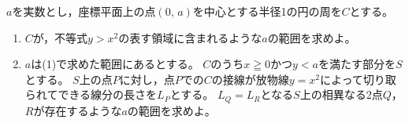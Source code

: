 \documentclass[../../main.tex]{subfiles}
\begin{document}
$a$を実数とし，座標平面上の点$(0, \, a)$を中心とする半径1の円の周を$C$とする。
\begin{enumerate}
  \item$C$が，不等式$y>x^2$の表す領域に含まれるような$a$の範囲を求めよ。
  \item$a$は(1)で求めた範囲にあるとする。
    $C$のうち$x\geqq0$かつ$y<a$を満たす部分を$S$とする。
    $S$上の点$P$に対し，点$P$での$C$の接線が放物線$y=x^2$によって切り取られてできる線分の長さを$L_P$とする。
    $L_Q=L_R$となる$S$上の相異なる2点$Q$，$R$が存在するような$a$の範囲を求めよ。
\end{enumerate}
\end{document}
